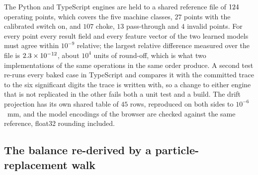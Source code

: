 The Python and TypeScript engines are held to a shared reference file of $124$ operating points, which covers the five machine classes, $27$ points with the
calibrated switch on, and $107$ choke, $13$ pass-through and $4$ invalid points. For every point every result field and every feature vector of the two learned models must agree
within $10^{-9}$ relative; the largest relative difference measured over the file is $2.3\times10^{-12}$, about $10^{4}$ units of round-off, which is
what two implementations of the same operations in the same order produce. A second test re-runs every baked case in TypeScript and compares it with the
committed trace to the six significant digits the trace is written with, so a change to either engine that is not replicated in the other fails both a
unit test and a build. The drift projection has its own shared table of $45$ rows, reproduced on both sides to $10^{-6}$~mm, and the model encodings of
the browser are checked against the same reference, float32 rounding included.

\subsection{The balance re-derived by a particle-replacement walk}\label{sec:val-walk}


